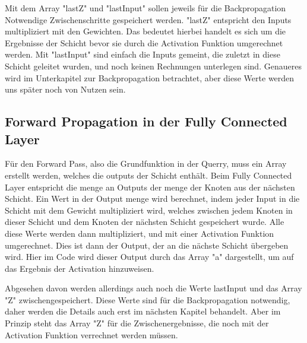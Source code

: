 \documentclass[12pt]{article}
\begin{document}
Mit dem Array "lastZ" und "lastInput" sollen jeweils für die Backpropagation Notwendige Zwischenschritte gespeichert werden. "lastZ" entspricht den Inputs multipliziert mit den Gewichten. Das bedeutet hierbei handelt es sich um die Ergebnisse der Schicht bevor sie durch die Activation Funktion umgerechnet werden. Mit "lastInput" sind einfach die Inputs gemeint, die zuletzt in diese Schicht geleitet wurden, und noch keinen Rechnungen unterlegen sind. Genaueres wird im Unterkapitel zur Backpropagation betrachtet, aber diese Werte werden uns später noch von Nutzen sein.


\subsection{Forward Propagation in der Fully Connected Layer}

Für den Forward Pass, also die Grundfunktion in der Querry, muss ein Array erstellt werden, welches die outputs der Schicht enthält. Beim Fully Connected Layer entspricht die menge an Outputs der menge der Knoten aus der nächsten Schicht. Ein Wert in der Output menge wird berechnet, indem jeder Input in die Schicht mit dem Gewicht multipliziert wird, welches zwischen jedem Knoten in dieser Schicht und dem Knoten der nächsten Schicht gespeichert wurde. Alle diese Werte werden dann multipliziert, und mit einer Activation Funktion umgerechnet. Dies ist dann der Output, der an die nächste Schicht übergeben wird. Hier im Code wird dieser Output durch das Array "a" dargestellt, um auf das Ergebnis der Activation hinzuweisen.

Abgesehen davon werden allerdings auch noch die Werte lastInput und das Array "Z" zwischengespeichert. Diese Werte sind für die Backpropagation notwendig, daher werden die Details auch erst im nächsten Kapitel behandelt. Aber im Prinzip steht das Array "Z" für die Zwischenergebnisse, die noch mit der Activation Funktion verrechnet werden müssen.
\end{document}
